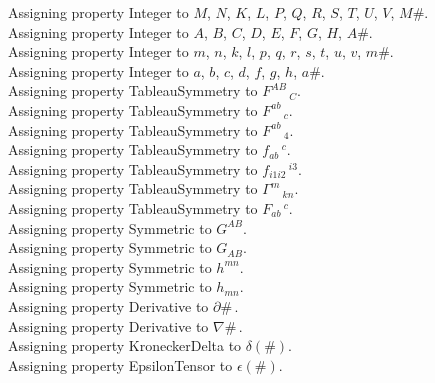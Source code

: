 \documentclass[11pt]{article}
\begin{document}
Assigning property Integer to $M$, $N$, $K$, $L$, $P$, $Q$, $R$, $S$, $T$, $U$, $V$, $M\#$.
\\
Assigning property Integer to $A$, $B$, $C$, $D$, $E$, $F$, $G$, $H$, $A\#$.
\\
Assigning property Integer to $m$, $n$, $k$, $l$, $p$, $q$, $r$, $s$, $t$, $u$, $v$, $m\#$.
\\
Assigning property Integer to $a$, $b$, $c$, $d$, $f$, $g$, $h$, $a\#$.
\\
Assigning property TableauSymmetry to ${F}^{A B}\,_{C}$.
\\
Assigning property TableauSymmetry to ${F}^{a b}\,_{c}$.
\\
Assigning property TableauSymmetry to ${F}^{a b}\,_{4}$.
\\
Assigning property TableauSymmetry to ${f}_{a b}\,^{c}$.
\\
Assigning property TableauSymmetry to ${f}_{i1 i2}\,^{i3}$.
\\
Assigning property TableauSymmetry to ${\Gamma}^{m}\,_{k n}$.
\\
Assigning property TableauSymmetry to ${F}_{a b}\,^{c}$.
\\
Assigning property Symmetric to ${G}^{A B}$.
\\
Assigning property Symmetric to ${G}_{A B}$.
\\
Assigning property Symmetric to ${h}^{m n}$.
\\
Assigning property Symmetric to ${h}_{m n}$.
\\
Assigning property Derivative to $\partial{\#}\, $.
\\
Assigning property Derivative to $\nabla{\#}\, $.
\\
Assigning property KroneckerDelta to $\delta(\#)$.
\\
Assigning property EpsilonTensor to $\epsilon(\#)$.
\end{document}
